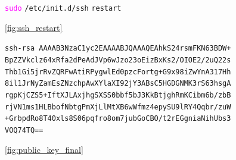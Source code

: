 \documentclass[11pt]{article}
\newcommand{\imagecaption}[1]{\vspace{-7pt}\caption*{\char91\ref{fig:#1}\char93}}
\newcommand{\codetext}[2]{\large\texttt{\textcolor{#1}{#2}}}
\begin{document}
		\begin{figure}[H]
			\centering
			\begin{code-box}
				\codetext{fuchsia}{sudo} \codetext{light-blue}{/etc/init.d/ssh} \codetext{light-orange}{restart}
			\end{code-box}
			\imagecaption{ssh_restart}
		\end{figure}
		
		\begin{figure}[H]
			\centering
			\begin{code-box}
				\codetext{dark-gray}{ssh-rsa AAAAB3NzaC1yc2EAAAABJQAAAQEAhkS24rsmFKN63BDW+
				BpZZVkclz64xRfa2dPeAdJVp6wJzo23oEizBxKs2/OIOE2/2uQ22s
				Thb1Gi5jrRvZQRFwAtiRPygwlEd0pzcFortg+G9x98iZwYnA317Hh
				8il1JrNyZamEsZNzchpAwXYlaXI92jY3ABsC5HGDGNMK3rS63hsgA
				rgpKjCZS5+IftXJLAxjhgSXSS0bbf5bJ3KkBtjghRmKCibm6b/zbB
				rjVN1ms1HLBbofNbtgPmXjLlMtXB6wWfmz4epySU9lRY4Qqbr/zuW
				+GrbpdRo8T40xls8S06pqfro8om7jubGoCBO/t2rEGgniaNihUbs3
				VOQ74TQ==}
			\end{code-box}
			\imagecaption{public_key_final}
		\end{figure}
		
		

	



























\end{document}
